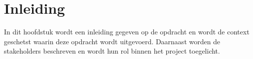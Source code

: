 \chapter{Inleiding}
In dit hoofdstuk wordt een inleiding gegeven op de opdracht en wordt de context geschetst waarin deze opdracht wordt uitgevoerd.
Daarnaast worden de stakeholders beschreven en wordt hun rol binnen het project toegelicht.



% 
% 
